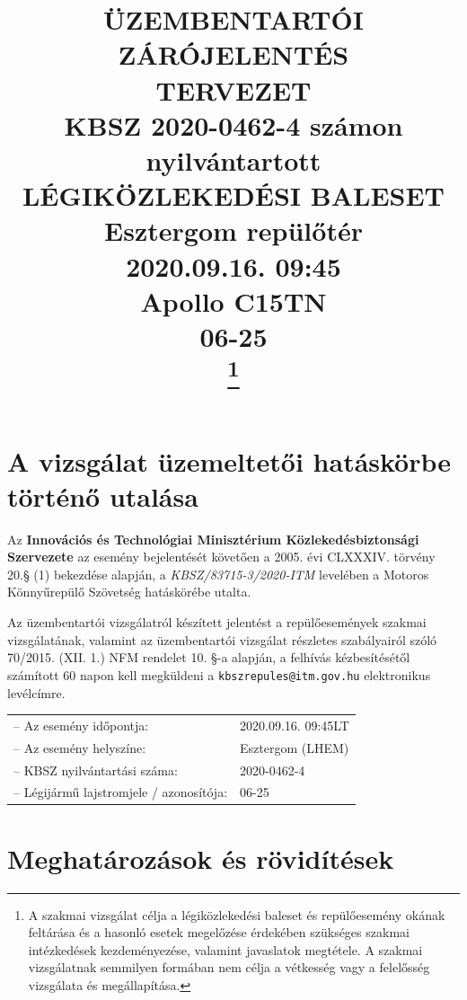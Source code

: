\documentclass[a4paper,10pt]{article}
\title{%
    \textbf{ÜZEMBENTARTÓI ZÁRÓJELENTÉS} \\ TERVEZET \\
    \vspace*{36pt}
    \textbf{KBSZ 2020-0462-4 számon nyilvántartott\\
    LÉGIKÖZLEKEDÉSI BALESET}\\
    \vspace*{24pt}
    Esztergom repülőtér\\
    \vspace*{24pt}
    2020.09.16. 09:45\\
    \vspace*{24pt}
    Apollo C15TN\\
    06-25\\
    \vspace*{5cm}
    \thanks{\normalsize{A szakmai vizsgálat célja a 
légiközlekedési baleset és repülőesemény 
okának feltárása és a hasonló esetek megelőzése érdekében szükséges szakmai 
intézkedések kezdeményezése, valamint javaslatok megtétele. A szakmai 
vizsgálatnak semmilyen formában nem célja a vétkesség vagy a felelősség 
vizsgálata és megállapítása.}}
}
\author{}
\date{}
\begin{document}
\maketitle
\pagebreak
\pagestyle{fancy}
\tableofcontents
\listoffigures
\pagebreak

%

\pagebreak


\section*{A vizsgálat üzemeltetői hatáskörbe történő utalása}
Az \textbf{Innovációs és Technológiai Minisztérium Közlekedésbiztonsági 
Szervezete} az esemény bejelentését követően a 2005. évi CLXXXIV. törvény 20.§ 
(1) bekezdése alapján, a \textit{KBSZ/83715-3/2020-ITM} levelében a 
Motoros Könnyűrepülő Szövetség hatáskörébe utalta.

Az üzembentartói vizsgálatról készített jelentést a repülőesemények szakmai 
vizsgálatának, valamint az üzembentartói vizsgálat részletes szabályairól szóló 
70/2015. (XII. 1.) NFM rendelet  10. §-a alapján, a felhívás kézbesítésétől 
számított 60 napon kell megküldeni a \texttt{kbszrepules@itm.gov.hu} 
elektronikus levélcímre.\\

\begin{tabular}{ll}
  -- Az esemény időpontja:& 2020.09.16. 09:45LT\\
  -- Az esemény helyszíne:& Esztergom (LHEM)\\
  -- KBSZ nyilvántartási száma:& 2020-0462-4\\
  -- Légijármű lajstromjele / azonosítója:& 06-25\\
\end{tabular}

\section*{Meghatározások és rövidítések}
\end{document}
